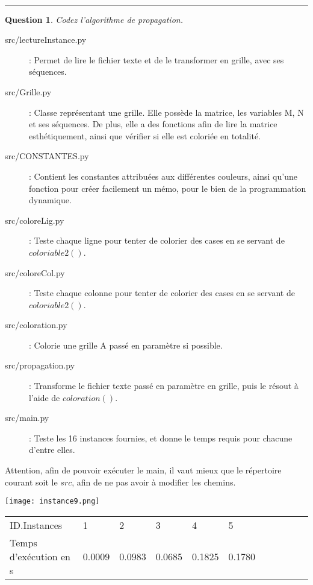 \documentclass[a4paper,12pt]{article}
\newtheorem{exo}{Question}
\begin{document}
\\

\noindent\rule{\textwidth}{1pt}


\begin{exo}
	Codez l'algorithme de propagation.
\end{exo}

\begin{description}
	\item[src/lectureInstance.py] : Permet de lire le fichier texte et de le transformer en grille, avec ses séquences.
	\item[src/Grille.py] : Classe représentant une grille. Elle possède la matrice, les variables M, N et ses séquences. De plus, elle a des fonctions afin de lire la matrice esthétiquement, ainsi que vérifier si elle est coloriée en totalité.
	\item[src/CONSTANTES.py] : Contient les constantes attribuées aux différentes couleurs, ainsi qu'une fonction pour créer facilement un mémo, pour le bien de la programmation dynamique.
	\item[src/coloreLig.py] : Teste chaque ligne pour tenter de colorier des cases en se servant de $coloriable2()$.
	\item[src/coloreCol.py] : Teste chaque colonne pour tenter de colorier des cases en se servant de $coloriable2()$.
	\item[src/coloration.py] : Colorie une grille A passé en paramètre si possible.
	\item[src/propagation.py] : Transforme le fichier texte passé en paramètre en grille, puis le résout à l'aide de $coloration()$.
	\item[src/main.py] : Teste les 16 instances fournies, et donne le temps requis pour chacune d'entre elles.
\end{description}

Attention, afin de pouvoir exécuter le main, il vaut mieux que le répertoire courant soit le $src$, afin de ne pas avoir à modifier les chemins.

\begin{center}\texttt{[image: instance9.png]}\end{center}

\newpage

\begin{table}
\centering
\begin{tabular}{|l|l|l|l|l|l|l|l|l|l|l|}
ID.Instances           & 1      & 2      & 3      & 4      & 5  \\
Temps d'exécution en s & 0.0009 & 0.0983 & 0.0685 & 0.1825 & 0.1780 
\end{tabular}
\end{table}
\end{document}
